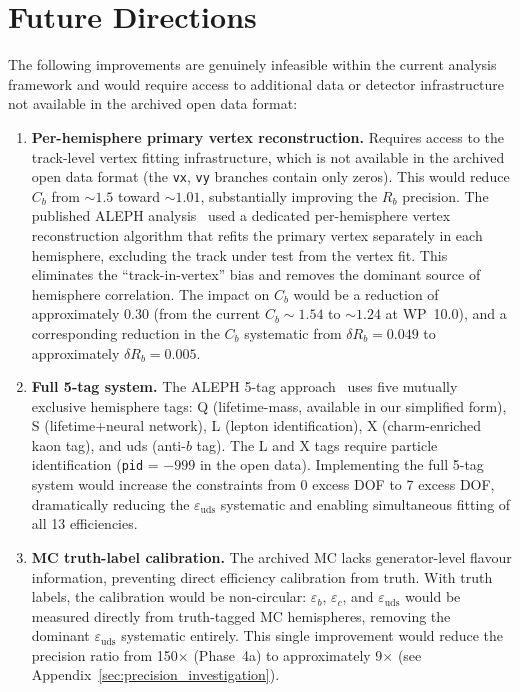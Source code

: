 \documentclass[11pt,a4paper]{article}
\begin{document}
\section{Future Directions}
\label{sec:future}

The following improvements are genuinely infeasible within the current analysis
framework and would require access to additional data or detector infrastructure
not available in the archived open data format:

\begin{enumerate}
\item \textbf{Per-hemisphere primary vertex reconstruction.} Requires access to the
track-level vertex fitting infrastructure, which is not available in the archived
open data format (the \texttt{vx}, \texttt{vy} branches contain only zeros). This
would reduce $C_b$ from $\sim 1.5$ toward $\sim 1.01$, substantially improving the
$R_b$ precision. The published ALEPH analysis~\cite{ALEPH:Rb:1996} used a dedicated
per-hemisphere vertex reconstruction algorithm that refits the primary vertex
separately in each hemisphere, excluding the track under test from the vertex fit.
This eliminates the ``track-in-vertex'' bias and removes the dominant source of
hemisphere correlation. The impact on $C_b$ would be a reduction of approximately
0.30 (from the current $C_b \sim 1.54$ to $\sim 1.24$ at WP~10.0), and a corresponding
reduction in the $C_b$ systematic from $\delta R_b = 0.049$ to approximately
$\delta R_b = 0.005$.

\item \textbf{Full 5-tag system.} The ALEPH 5-tag approach~\cite{ALEPH:Rb:1996}
uses five mutually exclusive hemisphere tags: Q (lifetime-mass, available in our
simplified form), S (lifetime+neural network), L (lepton identification), X
(charm-enriched kaon tag), and uds (anti-$b$ tag). The L and X tags require
particle identification (\texttt{pid} = $-999$ in the open data). Implementing the
full 5-tag system would increase the constraints from 0 excess DOF to 7 excess DOF,
dramatically reducing the $\varepsilon_\mathrm{uds}$ systematic and enabling
simultaneous fitting of all 13 efficiencies.

\item \textbf{MC truth-label calibration.} The archived MC lacks generator-level
flavour information, preventing direct efficiency calibration from truth. With truth
labels, the calibration would be non-circular: $\varepsilon_b$, $\varepsilon_c$, and
$\varepsilon_\mathrm{uds}$ would be measured directly from truth-tagged MC
hemispheres, removing the dominant $\varepsilon_\mathrm{uds}$ systematic entirely.
This single improvement would reduce the precision ratio from 150$\times$ (Phase~4a) to
approximately 9$\times$ (see Appendix~\ref{sec:precision_investigation}).


\end{enumerate}
\end{document}
